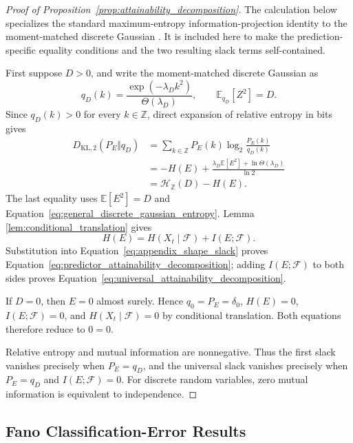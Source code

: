 \begin{proof}[Proof of Proposition~\ref{prop:attainability_decomposition}]
The calculation below specializes the standard maximum-entropy
information-projection identity to the moment-matched discrete Gaussian
\citep{csiszar_iprojection,cover_thomas}. It is included here to make the
prediction-specific equality conditions and the two resulting slack terms
self-contained.

First suppose \(D>0\), and write the moment-matched discrete Gaussian as
\[
q_D(k)
=
\frac{\exp(-\lambda_D k^2)}{\Theta(\lambda_D)},
\qquad
\mathbb{E}_{q_D}[Z^2]=D.
\]
Since \(q_D(k)>0\) for every \(k\in\mathbb{Z}\), direct expansion of
relative entropy in bits gives
\begin{align}
D_{\mathrm{KL},2}(P_E\Vert q_D)
&=
\sum_{k\in\mathbb{Z}}P_E(k)
\log_2\frac{P_E(k)}{q_D(k)}
\nonumber\\
&=
-H(E)
+
\frac{\lambda_D\mathbb{E}[E^2]
      +\ln\Theta(\lambda_D)}{\ln2}
\nonumber\\
&=
\mathcal{H}_{\mathbb{Z}}(D)-H(E).
\label{eq:appendix_shape_slack}
\end{align}
The last equality uses \(\mathbb{E}[E^2]=D\) and
Equation~\eqref{eq:general_discrete_gaussian_entropy}. Lemma
\ref{lem:conditional_translation} gives
\[
H(E)=H(X_t\mid\mathcal{F})+I(E;\mathcal{F}).
\]
Substitution into Equation~\eqref{eq:appendix_shape_slack} proves
Equation~\eqref{eq:predictor_attainability_decomposition}; adding
\(I(E;\mathcal{F})\) to both sides proves
Equation~\eqref{eq:universal_attainability_decomposition}.

If \(D=0\), then \(E=0\) almost surely. Hence \(q_0=P_E=\delta_0\),
\(H(E)=0\), \(I(E;\mathcal{F})=0\), and
\(H(X_t\mid\mathcal{F})=0\) by conditional translation. Both equations
therefore reduce to \(0=0\).

Relative entropy and mutual information are nonnegative. Thus the first
slack vanishes precisely when \(P_E=q_D\), and the universal slack
vanishes precisely when \(P_E=q_D\) and
\(I(E;\mathcal{F})=0\). For discrete random variables, zero mutual
information is equivalent to independence.
\end{proof}

\subsection{Fano Classification-Error Results}

